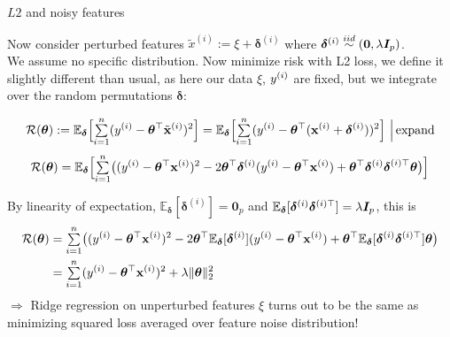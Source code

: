 \documentclass[11pt,compress,t,notes=noshow, xcolor=table]{beamer}
\begin{document}
\begin{vbframe}{$L2$ and noisy features}
\begin{footnotesize}
Now consider perturbed features $ \tilde{x}^{(i)}:= \xi + \bm{\delta}^{(i)}$ where $\bm{\delta}^{(i)} \overset{iid}{\sim} (\bm{0},\lambda \bm{I}_p)$. \\
We assume no specific distribution. Now minimize risk with L2 loss, we define it slightly different than usual, as here our data $\xi$, $y^{(i)}$ are fixed, but we integrate over the random permutations $\bm{\delta}$:


$$\mathcal{R}(\bm{\theta}):= \mathbb{E}_{\bm{\delta}}\Big[{\textstyle \sum\limits_{i=1}^n}(y^{(i)}-\bm{\theta}^{\top}\tilde{\mathbf{x}}^{(i)})^2\Big] = \mathbb{E}_{\bm{\delta}}\Big[{\textstyle \sum\limits_{i=1}^n}(y^{(i)}-\bm{\theta}^{\top}(\mathbf{x}^{(i)}+\bm{\delta}^{(i)}))^2\Big]\,\,\Big|\, \text{expand}$$
\vspace{-0.2cm}
$$\mathcal{R}(\bm{\theta}) = \mathbb{E}_{\bm{\delta}}\Big[{\textstyle \sum\limits_{i=1}^n}\big((y^{(i)}-\bm{\theta}^{\top}\mathbf{x}^{(i)})^2 - 2 \bm{\theta}^{\top}\bm{\delta}^{(i)}(y^{(i)}-\bm{\theta}^{\top}\mathbf{x}^{(i)}) + \bm{\theta}^{\top}\bm{\delta}^{(i)}\bm{{\delta}}^{(i) \top}\bm{\theta}\big)\Big]$$

By linearity of expectation, $\mathbb{E}_{\bm{\delta}}[\bm{\delta}^{(i)}]=\bm{0}_p$ and $\mathbb{E}_{\bm{\delta}}[\bm{\delta}^{(i)}\bm{\delta}^{(i)\top}]=\lambda \bm{I}_p$, this is
\vspace{-0.2cm}
%
\begin{align*}\mathcal{R}(\bm{\theta})&={\textstyle \sum\limits_{i=1}^n}\big((y^{(i)}-\bm{\theta}^{\top}\mathbf{x}^{(i)})^2 - 2 \bm{\theta}^{\top}\mathbb{E}_{\bm{\delta}}[\bm{\delta}^{(i)}](y^{(i)}-\bm{\theta}^{\top}\mathbf{x}^{(i)}) + \bm{\theta}^{\top}\mathbb{E}_{\bm{\delta}}[\bm{\delta}^{(i)}\bm{\delta}^{(i)\top}]\bm{\theta} \big) \\
&= {\textstyle \sum\limits_{i=1}^n}(y^{(i)}-\bm{\theta}^{\top}\mathbf{x}^{(i)})^2+\lambda \Vert \bm{\theta} \Vert_2^2
\end{align*}
$\Longrightarrow$ Ridge regression on unperturbed features {\small $\xi$} turns out to be the same as minimizing squared loss averaged over feature noise distribution!

\end{footnotesize}

\end{vbframe}



\endlecture
\end{document}
